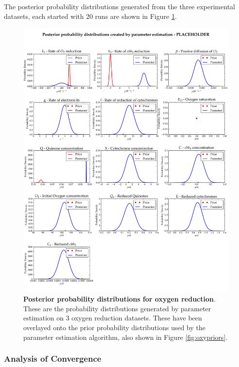 The posterior probability distributions generated from the three experimental datasets, each started with 20 runs are shown in Figure \ref{fig:oxyposteriors}.

\begin{figure}[tbp]
 \centering
 \includegraphics[width=15cm]{./05-oxygenreduction/data/posteriors.pdf}
 \caption[Posterior probability distributions for oxygen reduction]{{\bf Posterior probability distributions for oxygen reduction}. These are the probability distributions generated by parameter estimation on 3 oxygen reduction datasets. These have been overlayed onto the prior probability distributions used by the parameter estimation algorithm, also shown in Figure \ref{fig:oxypriors}.
 \label{fig:oxyposteriors}}
\end{figure}

\subsubsection{Analysis of Convergence}
